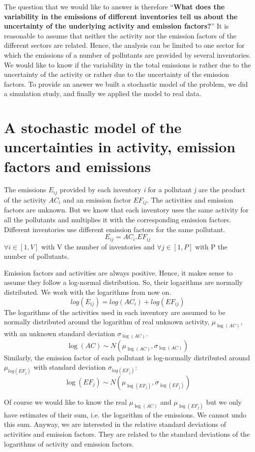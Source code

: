 \documentclass{article}
\begin{document}
The question that we would like to answer is therefore “\textbf{What does the variability in the emissions of different inventories tell us about the uncertainty of the underlying activity and emission factors?}”
It is reasonable to assume that neither the activity nor the emission factors of the different sectors are related. Hence, the analysis can be limited to one sector for which the emissions of a number of pollutants are provided by several inventories. We would like to know if the variability in the total emissions is rather due to the uncertainty of the activity or rather due to the uncertainty of the emission factors. To provide an answer we built a stochastic model of the problem, we did a simulation study, and finally we applied the model to real data. 
\section{A stochastic model of the uncertainties in activity, emission factors and emissions}
The emissions \(E_{ij}\) provided by each inventory \textit{i} for a pollutant \textit{j} are the product of the activity \(AC_{i}\) and an emission factor \(EF_{ij}\). The activities and emission factors are unknown. But we know that each inventory uses the same activity for all the pollutants and multiplies it with the corresponding emission factors. Different inventories use different emission factors for the same pollutant.
\[E_{ij}=AC_{i} . EF_{ij}\]
\(\forall i \in [1,V]\) with V the number of inventories and \(\forall j \in [1,P]\) with P the number of pollutants.

Emission factors and activities are always positive. Hence, it makes sense to assume they follow a log-normal distribution. So, their logarithms are normally distributed. We work with the logarithms from now on.
\[log(E_{ij})=log(AC_{i})+log(EF_{ij})\]
The logarithms of the activities used in each inventory are assumed to be normally distributed around the logarithm of real unknown activity, \(\mu_{\log(AC)}\), with an unknown standard deviation \(\sigma_{\log(AC)}\).
\[\log(AC) \sim N(\mu_{\log(AC)},\sigma_{\log(AC)})\]
Similarly, the emission factor of each pollutant is log-normally distributed around \(\mu_{log(EF_{j})}\) with standard deviation \(\sigma_{log(EF_{j})}\): 
\[\log(EF_{j}) \sim N(\mu_{\log(EF_{j})}, \sigma_{\log(EF_{j})})\]

Of course we would like to know the real \(\mu_{\log(AC)}\)  and \(\mu_{\log(EF_{j})}\) but we only have estimates of their sum, i.e. the logarithm of the emissions. We cannot undo this sum. Anyway, we are interested in the relative standard deviations of activities and emission factors. They are related to the standard deviations of the logarithms of activity and emission factors.
\end{document}
